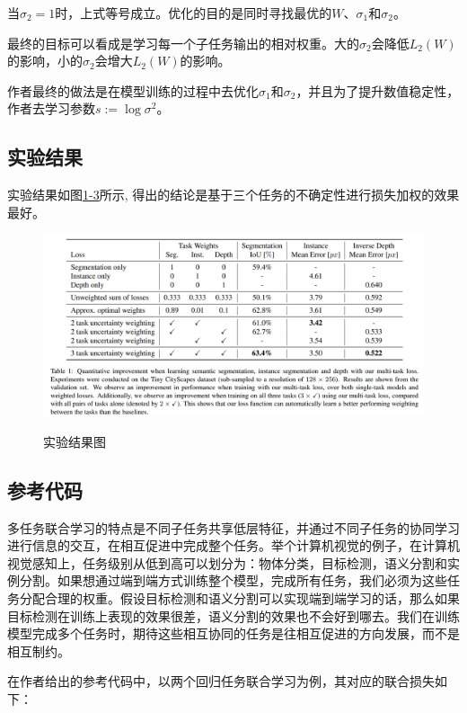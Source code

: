 当$\sigma_2 = 1$时，上式等号成立。优化的目的是同时寻找最优的$W$、$\sigma_1$和$\sigma_2$。

最终的目标可以看成是学习每一个子任务输出的相对权重。大的$\sigma_2$会降低$L_2(W)$的影响，小的$\sigma_2$会增大$L_2(W)$的影响。

作者最终的做法是在模型训练的过程中去优化$\sigma_1$和$\sigma_2$，并且为了提升数值稳定性，作者去学习参数$s:=\log \sigma^2$。


\subsection{实验结果}

实验结果如图\href{fig:1-3}{1-3}所示, 得出的结论是基于三个任务的不确定性进行损失加权的效果最好。
\begin{figure}
  \centering
  \includegraphics[width=5in]{figure/example/3.png}\\
  \caption{实验结果图}
  \label{fig:1-3}
\end{figure}

\subsection{参考代码}

多任务联合学习的特点是不同子任务共享低层特征，并通过不同子任务的协同学习进行信息的交互，在相互促进中完成整个任务。举个计算机视觉的例子，在计算机视觉感知上，任务级别从低到高可以划分为：物体分类，目标检测，语义分割和实例分割。如果想通过端到端方式训练整个模型，完成所有任务，我们必须为这些任务分配合理的权重。假设目标检测和语义分割可以实现端到端学习的话，那么如果目标检测在训练上表现的效果很差，语义分割的效果也不会好到哪去。我们在训练模型完成多个任务时，期待这些相互协同的任务是往相互促进的方向发展，而不是相互制约。

在作者给出的参考代码中，以两个回归任务联合学习为例，其对应的联合损失如下：

